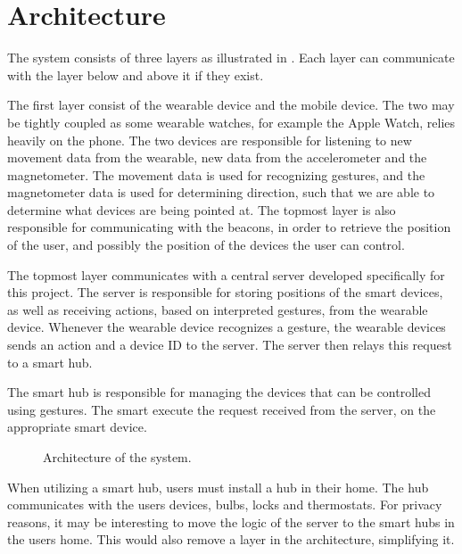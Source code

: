 \section{Architecture}
The system consists of three layers as illustrated in . 
Each layer can communicate with the layer below and above it if they exist.

The first layer consist of the wearable device and the mobile device. 
The two may be tightly coupled as some wearable watches, 
for example the Apple Watch, relies heavily on the phone. 
The two devices are responsible for listening to new movement data from the wearable, 
\eg new data from the accelerometer and the magnetometer.
The movement data is used for recognizing gestures, 
and the magnetometer data is used for determining direction, 
such that we are able to determine what devices are being pointed at. 
The topmost layer is also responsible for communicating with the beacons, 
in order to retrieve the position of the user, 
and possibly the position of the devices the user can control. 

The topmost layer communicates with a central server developed specifically for this project. 
The server is responsible for storing positions of the smart devices, 
as well as receiving actions, based on interpreted gestures, from the wearable device.
Whenever the wearable device recognizes a gesture, 
the wearable devices sends an action and a device ID to the server.
The server then relays this request to a smart hub. 

The smart hub is responsible for managing the devices that can be controlled using gestures. 
The smart execute the request received from the server, 
on the appropriate smart device. 

\begin{figure}[h]
  \centering
  
  \caption{Architecture of the system.}
  \label{fig:architecture}
\end{figure}

When utilizing a smart hub, users must install a hub in their home. 
The hub communicates with the users devices, \eg bulbs, locks and thermostats. 
For privacy reasons, it may be interesting to move the logic of the server to the smart hubs in the users home. 
This would also remove a layer in the architecture, simplifying it.

%

